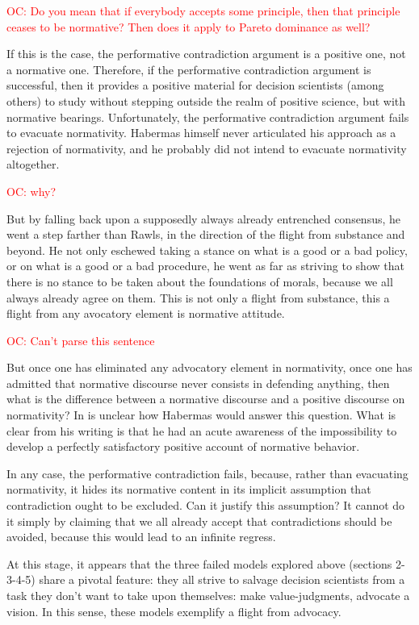 \documentclass[preprint,11pt]{elsarticle}
\newcommand{\commentOC}[1]{\textcolor{red}{OC: #1}}
\begin{document}
\commentOC{Do you mean that if everybody
accepts some principle, then that principle ceases to be
normative? Then does it apply to Pareto dominance as well?}

If this is the case, the performative contradiction argument is a positive one, not a normative one. Therefore, if the performative contradiction argument is successful, then it provides a positive material for decision scientists (among others) to study without stepping outside the realm of positive science, but with normative bearings. Unfortunately, the performative contradiction argument fails to evacuate normativity. Habermas himself never articulated his approach as a rejection of normativity, and he probably did not intend to evacuate normativity altogether. 

\commentOC{why?
}

But by falling back upon a supposedly always already entrenched consensus, he went a step farther than Rawls, in the direction of the flight from substance and beyond. He not only eschewed taking a stance on what is a good or a bad policy, or on what is a good or a bad procedure, he went as far as striving to show that there is no stance to be taken about the foundations of morals, because we all always already agree on them. This is not only a flight from substance, this a flight from any avocatory element is normative attitude. 

\commentOC{ Can’t parse this sentence}

But once one has eliminated any advocatory element in normativity, once one has admitted that normative discourse never consists in defending anything, then what is the difference between a normative discourse and a positive discourse on normativity? In is unclear how Habermas would answer this question. What is clear from his writing is that he had an acute awareness of the impossibility to develop a perfectly satisfactory positive account of normative behavior.

In any case, the performative contradiction fails, because, rather than evacuating normativity, it hides its normative content in its implicit assumption that contradiction ought to be excluded. Can it justify this assumption? It cannot do it simply by claiming that we all already accept that contradictions should be avoided, because this would lead to an infinite regress.

At this stage, it appears that the three failed models explored above (sections 2-3-4-5) share a pivotal feature: they all strive to salvage decision scientists from a task they don’t want to take upon themselves: make value-judgments, advocate a vision. In this sense, these models exemplify a flight from advocacy. 
\end{document}
